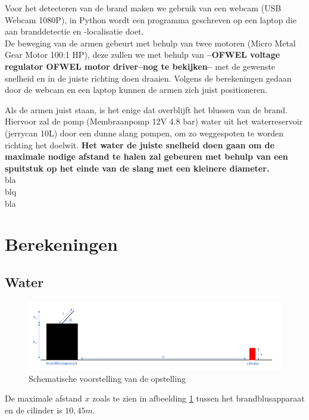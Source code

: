 \documentclass[kulak]{kulakarticle} %
\begin{document}
Voor het detecteren van de brand maken we gebruik van een webcam (USB Webcam 1080P), in Python wordt een programma geschreven op een laptop die aan branddetectie en -localisatie doet. \\

De beweging van de armen gebeurt met behulp van twee motoren (Micro Metal Gear Motor 100:1 HP), deze zullen we met behulp van {\bf{--OFWEL voltage regulator OFWEL motor driver--nog te bekijken--}} met de gewenste snelheid en in de juiste richting doen draaien. Volgens de berekeningen gedaan door de webcam en een laptop kunnen de armen zich juist positioneren.

Als de armen juist staan, is het enige dat overblijft het blussen van de brand. Hiervoor zal de pomp (Membraanpomp 12V 4.8 bar) water uit het waterreservoir (jerrycan 10L) door een dunne slang pompen, om zo weggespoten te worden richting het doelwit. {\bf{Het water de juiste snelheid doen gaan om de maximale nodige afstand te halen zal gebeuren met behulp van een spuitstuk op het einde van de slang met een kleinere diameter.}}
\\
bla
\\
blq
\\
bla
\\

\section{Berekeningen}
\subsection{Water}

\begin{figure} [h!]
	\centering
	\includegraphics[width = 1 \textwidth]{schematische voorstelling water LATEX}
	\caption{Schematische voorstelling van de opstelling}
	\label{schematische voorstelling}
\end{figure}
De maximale afstand \(x\) zoals te zien in afbeelding \ref{schematische voorstelling} tussen het brandblusapparaat en de cilinder is \(10,45m\).
\end{document}
